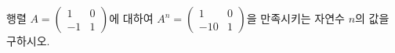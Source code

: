 행렬 $A=\begin{pmatrix} 1 & 0 \\ -1 & 1 \end{pmatrix}$에 대하여 $A^n=\begin{pmatrix} 1 & 0 \\ -10 & 1 \end{pmatrix}$을 만족시키는 자연수 $n$의 값을 구하시오.
